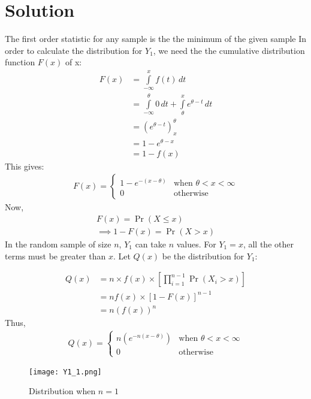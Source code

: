\documentclass[journal,12pt,twocolumn]{IEEEtran}
\providecommand{\pr}[1]{\ensuremath{\Pr\left(#1\right)}}
\providecommand{\brak}[1]{\ensuremath{\left(#1\right)}}
\theoremstyle{remark}
\numberwithin{equation}{subsection}
\begin{document}
\section{\textbf{Solution}}
The first order statistic for any sample is the the minimum of the given sample 
In order to calculate the distribution for $Y_1$, we need the the cumulative distribution function $F(x)$ of x:\\
\begin{align}
  F(x) &=\displaystyle\int\limits_{-\infty}^{x} f(t) \,dt\\
  &= \displaystyle\int\limits_{-\infty}^{\theta}0\,dt + \displaystyle\int\limits_{\theta}^{x}e^{\theta-t}\,dt\\
  &=\brak{e^{\theta-t}}_{x}^{\theta}\\
  &= 1-e^{\theta-x} \\
  &= 1-f(x)
\end{align}
This gives: 
\begin{align}
    F(x) = 
    \begin{cases}
    1-e^{-(x-\theta)} &\text{when }\theta<x<\infty\\
    0 &\text{otherwise}
    \end{cases}
\end{align}
Now,
\begin{align}
    F(x) = \pr{X\leq x}\\
    \implies 1-F(x) = \pr{X>x}
\end{align}
In the random sample of size $n$, $Y_1$ can take $n$  values. For $Y_1 = x$, all the other terms must be greater than $x$. Let $Q(x)$ be the distribution for $Y_1$:

\begin{align}
    Q(x) &= n\times f(x)\times\left[\prod_{i=1}^{n-1}\pr{X_i>x}\right]\\
    &= n f(x)\times[1-F(x)]^{n-1}\\
    &= n(f(x))^{n}
\end{align}
Thus,
\begin{align}
    Q(x) = \label{eq_1}
    \begin{cases}
    n(e^{-n(x-\theta)})&\text{when }\theta<x<\infty\\
    0 &\text{otherwise }
    \end{cases}
\end{align}
\begin{figure}[h!]
    \centering
    \texttt{[image: Y1\_1.png]}
    \caption{Distribution when $n=1$}
    \label{fig:fig_1}
\end{figure}
\end{document}
